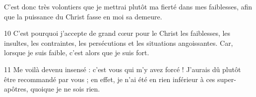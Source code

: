 C’est donc très volontiers que je mettrai plutôt ma fierté dans mes faiblesses, afin que la puissance du Christ fasse en moi sa demeure.

10 C’est pourquoi j’accepte de grand cœur pour le Christ les faiblesses, les insultes, les contraintes, les persécutions et les situations angoissantes. Car, lorsque je suis faible, c’est alors que je suis fort.

11 Me voilà devenu insensé : c’est vous qui m’y avez forcé ! J’aurais dû plutôt être recommandé par vous ; en effet, je n’ai été en rien inférieur à ces super-apôtres, quoique je ne sois rien.